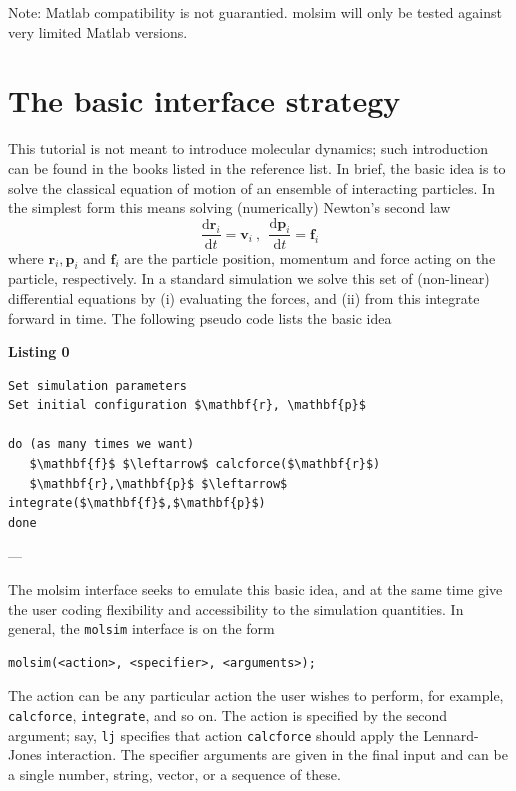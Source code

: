 \documentclass[11pt]{article}
\begin{document}
\bigskip

\noindent Note: Matlab compatibility is not guarantied. \textsf{molsim} will
only be tested against very limited Matlab versions.

\section{The basic interface strategy}
This tutorial is not meant to introduce molecular dynamics; such introduction
can be found in the books listed in the reference list. In brief, the basic idea
is to solve the classical equation of motion of an ensemble of interacting
particles. In the simplest form this means solving (numerically) Newton's second
law
\begin{equation}
  \frac{\mathrm{d}\mathbf{r}_i}{\mathrm{d} t} = \mathbf{v}_i \ , \ \
  \frac{\mathrm{d}\mathbf{p}_i}{\mathrm{d} t} = \mathbf{f}_i
\end{equation}
where $\mathbf{r}_i, \mathbf{p}_i$ and $\mathbf{f}_i$ are the particle position,
momentum and force acting on the particle, respectively. In a standard
simulation we solve this set of (non-linear) differential equations by (i)
evaluating the forces, and (ii) from this integrate forward in time. The
following pseudo code lists the basic idea

\bigskip

\noindent \textbf{Listing 0}
\begin{lstlisting}
Set simulation parameters
Set initial configuration $\mathbf{r}, \mathbf{p}$

do (as many times we want)
   $\mathbf{f}$ $\leftarrow$ calcforce($\mathbf{r}$)
   $\mathbf{r},\mathbf{p}$ $\leftarrow$ integrate($\mathbf{f}$,$\mathbf{p}$)
done
\end{lstlisting}
---

\noindent The \textsf{molsim} interface seeks to emulate this basic idea, and at
the same time give the user coding flexibility and accessibility to the
simulation quantities. In general, the \verb!molsim! interface is on the form
\begin{verbatim}
molsim(<action>, <specifier>, <arguments>);
\end{verbatim}
The action can be any particular action the user wishes to perform, for example,
\verb!calcforce!, \verb!integrate!, and so on. The action is specified by the
second argument; say, \verb!lj! specifies that action \verb!calcforce! should
apply the Lennard-Jones interaction. The specifier arguments are given in the
final input and can be a single number, string, vector, or a sequence of these.
\end{document}
